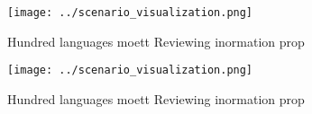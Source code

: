 \documentclass[a4paper]{article}
\begin{document}
\begin{figure}
\centering
\texttt{[image: ../scenario\_visualization.png]}
\caption{Hundred languages moett Reviewing inormation prop
}
\end{figure}
 
\begin{figure}
\centering
\texttt{[image: ../scenario\_visualization.png]}
\caption{Hundred languages moett Reviewing inormation prop
}
\end{figure}
 
\end{document}
